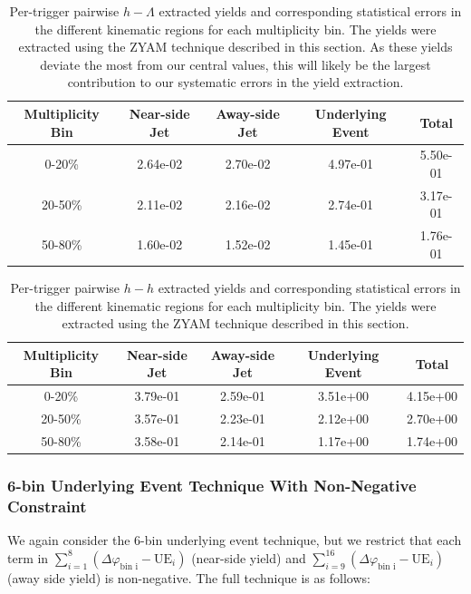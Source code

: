 \documentclass[ALICE,manyauthors]{ALICE_analysis_notes}
\begin{document}
\begin{table}[h!]
\centering
\begin{tabular}{| c | c | c | c | c | }
\hline
Multiplicity Bin & Near-side Jet & Away-side Jet & Underlying Event & Total  \\
\hline
	
0-20\% & 2.64e-02  & 2.70e-02  & 4.97e-01 & 5.50e-01 \\
20-50\% & 2.11e-02 & 2.16e-02  & 2.74e-01 & 3.17e-01 \\
50-80\% & 1.60e-02 & 1.52e-02  & 1.45e-01 & 1.76e-01 \\
	
\hline
\end{tabular}
\caption{Per-trigger pairwise $h-\Lambda$ extracted yields and corresponding statistical errors in the different kinematic regions for each multiplicity bin. The yields were extracted using the ZYAM technique described in this section. As these yields deviate the most from our central values, this will likely be the largest contribution to our systematic errors in the yield extraction.}
\label{h_lambda_yield_table_zyam}
\end{table}
	
\begin{table}[h!]
\centering
\begin{tabular}{| c | c | c | c | c | }
\hline
Multiplicity Bin & Near-side Jet & Away-side Jet & Underlying Event & Total  \\
\hline

0-20\% & 3.79e-01  & 2.59e-01  & 3.51e+00 & 4.15e+00 \\
20-50\% & 3.57e-01 & 2.23e-01  & 2.12e+00 & 2.70e+00 \\
50-80\% & 3.58e-01 & 2.14e-01  & 1.17e+00 & 1.74e+00 \\

\hline
\end{tabular}
\caption{Per-trigger pairwise $h-h$ extracted yields and corresponding statistical errors in the different kinematic regions for each multiplicity bin. The yields were extracted using the ZYAM technique described in this section.}
\label{h_h_yield_table_zyam}
\end{table}


\subsubsection{6-bin Underlying Event Technique With Non-Negative Constraint}
\label{6binnonneg}
We again consider the 6-bin underlying event technique, but we restrict that each term in $\sum_{i=1}^{8} (\Delta\varphi_\text{bin i} - \text{UE}_i)$ (near-side yield) and $\sum_{i=9}^{16} (\Delta\varphi_\text{bin i} - \text{UE}_i)$ (away side yield) is non-negative. The full technique is as follows:
\end{document}
